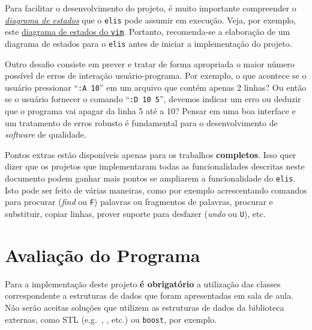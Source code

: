 \documentclass[11pt,a4paper]{article}
\begin{document}
Para facilitar o desenvolvimento do projeto, é muito importante compreender o
\href{http://en.wikipedia.org/wiki/State_diagram}{\emph{diagrama de estados}} que
o \texttt{elis} pode assumir em execução.
Veja, por exemplo, este \href{https://darkpan.com/files/vim.svg}{diagrama de estados do \texttt{vim}}.
Portanto, recomenda-se a elaboração de um diagrama de estados para o \texttt{elis} antes de iniciar
a implementação do projeto.

Outro desafio consiste em prever e tratar de forma apropriada o maior número possível
de erros de interação usuário-programa.
Por exemplo, o que acontece se o usuário pressionar ``\texttt{:A 10}'' em um arquivo
que contém apenas 2 linhas?
Ou então se o usuário fornecer o comando ``\texttt{:D 10 5}'', devemos indicar
um erro ou deduzir que o programa vai apagar da linha 5 até a 10?
Pensar em uma boa interface e um tratamento de erros robusto é fundamental para
o desenvolvimento de \emph{software} de qualidade.

Pontos extras estão disponíveis apenas para os trabalhos \textbf{completos}.
Isso quer dizer que os projetos que implementaram todas as funcionalidades
descritas neste documento podem ganhar mais pontos se ampliarem a funcionalidade
do \texttt{elis}.
Isto pode ser feito de várias maneiras, como por exemplo 
acrescentando comandos para procurar (\textit{find} ou \texttt{F}) palavras
ou fragmentos de palavras, procurar e substituir, copiar linhas, prover
suporte para desfazer (\textit{undo} ou \texttt{U}), etc.

\section{Avaliação do Programa}
\label{sec:avaliacao}

Para a implementação deste projeto \textbf{é obrigatório} a utilização das
classes correspondente a estruturas de dados que foram apresentadas em
sala de aula.
Não serão aceitas soluções que utilizem as estruturas de dados da biblioteca
externas, como STL (e.g.\ , , etc.)
ou \texttt{boost}, por exemplo.
\end{document}
